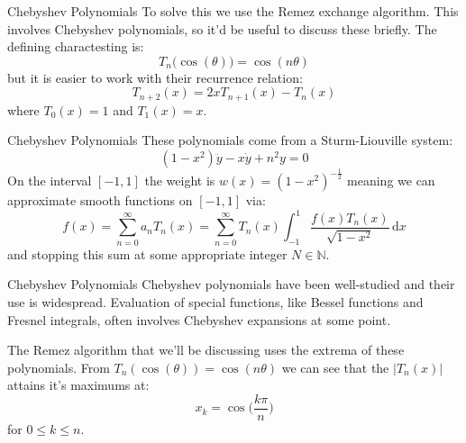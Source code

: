 \documentclass{beamer}
\begin{document}
    \begin{frame}{Chebyshev Polynomials}
        To solve this we use the Remez exchange algorithm. This involves
        Chebyshev polynomials, so it'd be useful to discuss these briefly.
        The defining charactesting is:
        \begin{equation}
            T_{n}\big(\cos(\theta)\big)=\cos(n\theta)
        \end{equation}
        but it is easier to work with their recurrence relation:
        \begin{equation}
            T_{n+2}(x)=2xT_{n+1}(x)-T_{n}(x)
        \end{equation}
        where $T_{0}(x)=1$ and $T_{1}(x)=x$.
    \end{frame}
    \begin{frame}{Chebyshev Polynomials}
        These polynomials come from a Sturm-Liouville system:
        \begin{equation}
            (1-x^{2})\ddot{y}-x\dot{y}+n^{2}y=0
        \end{equation}
        On the interval $[-1,1]$ the weight is
        $w(x)=(1-x^{2})^{-\frac{1}{2}}$ meaning we can approximate smooth
        functions on $[-1,1]$ via:
        \begin{equation}
            f(x)
            =\sum_{n=0}^{\infty}a_{n}T_{n}(x)
            =\sum_{n=0}^{\infty}T_{n}(x)\int_{-1}^{1}
                \frac{f(x)T_{n}(x)}{\sqrt{1-x^2}}\,\textrm{d}x
        \end{equation}
        and stopping this sum at some appropriate integer $N\in\mathbb{N}$.
    \end{frame}
    \begin{frame}{Chebyshev Polynomials}
        Chebyshev polynomials have been well-studied and their use is
        widespread. Evaluation of special functions, like Bessel functions and
        Fresnel integrals, often involves Chebyshev expansions at some point.
        \par\hfill\par
        The Remez algorithm that we'll be discussing uses the extrema of these
        polynomials. From $T_{n}(\cos(\theta))=\cos(n\theta)$ we can see that
        the $|T_{n}(x)|$ attains it's maximums at:
        \begin{equation}
            x_{k}=\cos\Big(\frac{k\pi}{n}\Big)
        \end{equation}
        for $0\leq{k}\leq{n}$.
    \end{frame}
\end{document}

